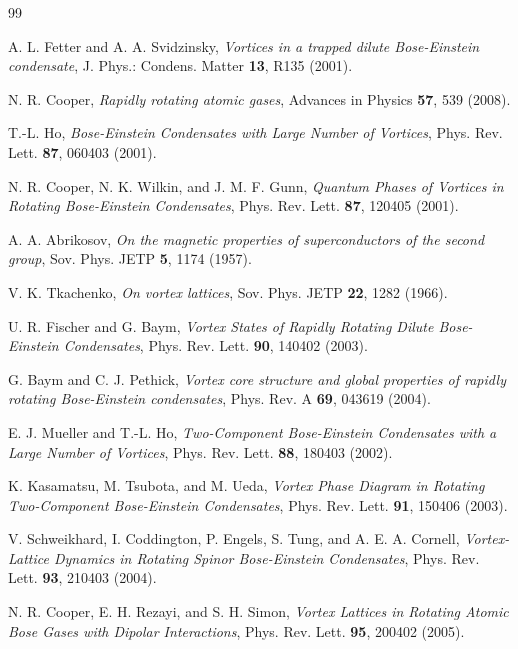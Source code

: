 \documentclass[reprint,aps,prl,twocolumn,superscriptaddress]{revtex4-1}
\begin{document}
\begin{thebibliography}{99}

 A. L. Fetter and A. A. Svidzinsky, \textit{Vortices in a trapped dilute Bose-Einstein condensate}, {J. Phys.: Condens. Matter {\bf 13}, R135 (2001)}.

  N. R. Cooper, \textit{Rapidly rotating atomic gases}, {Advances in Physics {\bf 57}, 539 (2008)}.

  T.-L. Ho, \textit{Bose-Einstein Condensates with Large Number of Vortices}, {Phys. Rev. Lett. {\bf 87}, 060403 (2001)}.

 N. R. Cooper, N. K. Wilkin, and J. M. F. Gunn, \textit{Quantum Phases of Vortices in Rotating Bose-Einstein Condensates}, {Phys. Rev. Lett. {\bf 87}, 120405 (2001)}.


 A. A. Abrikosov, \textit{On the magnetic properties of superconductors of the second group}, {Sov. Phys. JETP {\bf 5}, 1174 (1957)}.
    
 V. K. Tkachenko, \textit{On vortex lattices}, {Sov. Phys. JETP {\bf 22}, 1282 (1966)}.

 U. R. Fischer and G. Baym, \textit{Vortex States of Rapidly Rotating Dilute Bose-Einstein Condensates},  {Phys. Rev. Lett. {\bf 90}, 140402 (2003)}.

 G. Baym and C. J. Pethick, \textit{Vortex core structure and global properties of rapidly rotating Bose-Einstein condensates},  {Phys. Rev. A {\bf 69}, 043619 (2004)}.

 E. J. Mueller and T.-L. Ho, \textit{Two-Component Bose-Einstein Condensates with a Large Number of Vortices}, {Phys. Rev. Lett. {\bf 88}, 180403 (2002)}.

 K. Kasamatsu, M. Tsubota, and M. Ueda, \textit{Vortex Phase Diagram in Rotating Two-Component Bose-Einstein Condensates}, {Phys. Rev. Lett. {\bf 91}, 150406 (2003)}.

 V. Schweikhard, I. Coddington, P. Engels, S. Tung, and A. E. A. Cornell, \textit{Vortex-Lattice Dynamics in Rotating Spinor Bose-Einstein Condensates},  {Phys. Rev. Lett. {\bf 93}, 210403 (2004)}.


 N. R. Cooper, E. H. Rezayi, and S. H. Simon, \textit{Vortex Lattices in Rotating Atomic Bose Gases with Dipolar Interactions}, {Phys. Rev. Lett. {\bf 95}, 200402 (2005)}.


\end{thebibliography}
\end{document}
